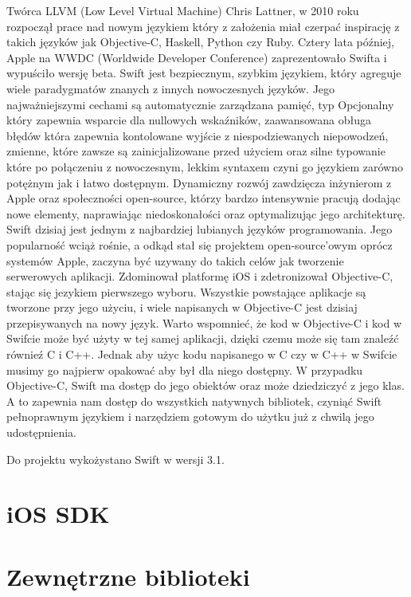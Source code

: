 Twórca LLVM (Low Level Virtual Machine) Chris Lattner, w 2010 roku rozpoczął prace nad nowym językiem który z założenia miał czerpać
inspirację z takich języków jak Objective-C, Haskell, Python czy Ruby. Cztery lata później, Apple na WWDC (Worldwide Developer
Conference) zaprezentowało Swifta i wypuściło wersję beta. Swift jest bezpiecznym, szybkim językiem, który agreguje wiele paradygmatów
znanych z innych nowoczesnych języków. Jego najważniejszymi cechami są automatycznie zarządzana pamięć, typ Opcjonalny który zapewnia
wsparcie dla nullowych wskaźników, zaawansowana obługa błędów która zapewnia kontolowane wyjście z niespodziewanych niepowodzeń, zmienne,
które zawsze są zainicjalizowane przed użyciem oraz silne typowanie które po połączeniu z nowoczesnym, lekkim syntaxem czyni go językiem
zarówno potężnym jak i łatwo dostępnym. Dynamiczny rozwój zawdzięcza inżynierom z Apple oraz społeczności open-source, którzy bardzo
intensywnie pracują dodając nowe elementy, naprawiając niedoskonałości oraz optymalizując jego architekturę. Swift dzisiaj jest jednym
z najbardziej lubianych języków programowania. Jego popularność wciąż rośnie, a odkąd stał się projektem open-source'owym oprócz
systemów Apple, zaczyna być uzywany do takich celów jak tworzenie serwerowych aplikacji. Zdominował platformę iOS i zdetronizował
Objective-C, stając się jezykiem pierwszego wyboru. Wszystkie powstające aplikacje są tworzone przy jego użyciu, i wiele napisanych w
Objective-C jest dzisiaj przepisywanych na nowy język. Warto wspomnieć, że kod w Objective-C i kod w Swifcie może być użyty w tej samej
aplikacji, dzięki czemu może się tam znaleźć równieź C i C++. Jednak aby użyc kodu napisanego w C czy w C++ w Swifcie musimy go najpierw
opakować aby był dla niego dostępny. W przypadku Objective-C, Swift ma dostęp do jego obiektów oraz może dziedziczyć z jego klas. A to
zapewnia nam dostęp do wszystkich natywnych bibliotek, czyniąć Swift pełnoprawnym językiem i narzędziem gotowym do użytku już z chwilą
jego udostępnienia.

Do projektu wykożystano Swift w wersji 3.1.




\section{iOS SDK}

\section{Zewnętrzne biblioteki}
